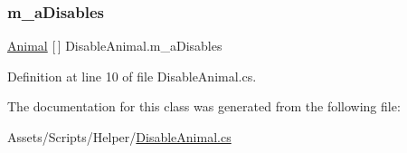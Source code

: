 \subsubsection{\texorpdfstring{m\+\_\+a\+Disables}{m\_aDisables}}
{\footnotesize\ttfamily \mbox{\hyperlink{class_animal}{Animal}} \mbox{[}$\,$\mbox{]} Disable\+Animal.\+m\+\_\+a\+Disables}



Definition at line 10 of file Disable\+Animal.\+cs.



The documentation for this class was generated from the following file\+:\begin{DoxyCompactItemize}
\item 
Assets/\+Scripts/\+Helper/\mbox{\hyperlink{_disable_animal_8cs}{Disable\+Animal.\+cs}}\end{DoxyCompactItemize}
